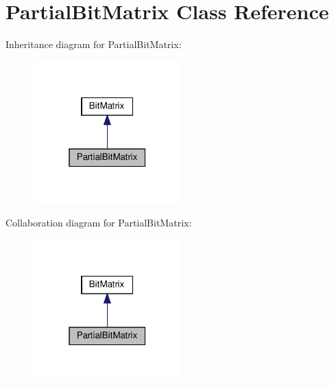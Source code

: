 \hypertarget{classPartialBitMatrix}{}\section{Partial\+Bit\+Matrix Class Reference}
\label{classPartialBitMatrix}


Inheritance diagram for Partial\+Bit\+Matrix\+:
\nopagebreak
\begin{figure}[H]
\begin{center}
\leavevmode
\includegraphics[width=163pt]{classPartialBitMatrix__inherit__graph}
\end{center}
\end{figure}


Collaboration diagram for Partial\+Bit\+Matrix\+:
\nopagebreak
\begin{figure}[H]
\begin{center}
\leavevmode
\includegraphics[width=163pt]{classPartialBitMatrix__coll__graph}
\end{center}
\end{figure}

